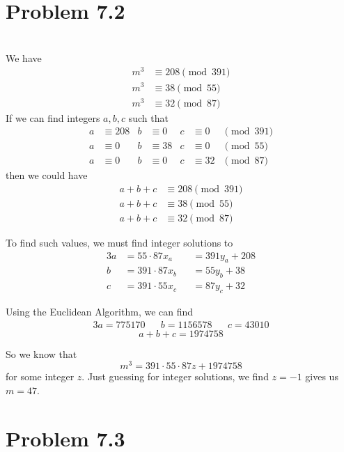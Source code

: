 \documentclass[12pt]{article}
\begin{document}
\section*{Problem 7.2}
\\

We have
\begin{align*}
    m^3 &\equiv 208 \pmod{391} \\
    m^3 &\equiv 38 \pmod{55} \\
    m^3 &\equiv 32 \pmod{87}
\end{align*}
If we can find integers $a,b,c$ such that
\begin{align*}
    a &\equiv 208 & b &\equiv 0 & c &\equiv 0 & \pmod{391} \\
    a &\equiv 0 & b &\equiv 38 & c &\equiv 0 & \pmod{55} \\ 
    a &\equiv 0 & b &\equiv 0 & c &\equiv 32 & \pmod{87} 
\end{align*}
then we could have
\begin{align*}
    a+b+c &\equiv 208 \pmod{391} \\
    a+b+c &\equiv 38 \pmod{55} \\
    a+b+c &\equiv 32 \pmod{87}
\end{align*}

To find such values, we must find integer solutions to
\begin{alignat*}{3}
    a &= 55\cdot87 x_a &&= 391y_a + 208 \\
    b &= 391\cdot87 x_b &&= 55y_b + 38 \\
    c &= 391\cdot55 x_c &&= 87y_c + 32
\end{alignat*}

Using the Euclidean Algorithm, we can find
\begin{align*}{3}
    a = 775170 && b = 1156578 && c = 43010
\end{align*}
\[a+b+c = 1974758\]

So we know that
\[m^3 = 391\cdot55\cdot87z + 1974758\]
for some integer $z$. Just guessing for integer solutions, we find $z=-1$ gives us $m=47$.




\section*{Problem 7.3}
\\
\end{document}
